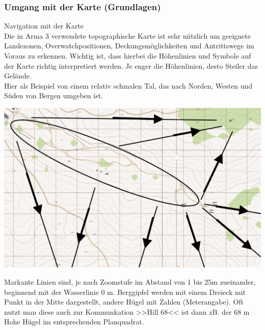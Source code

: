 \newpage

\subsubsection{Umgang mit der Karte (Grundlagen)}

	Navigation mit der Karte \\

	Die in Arma 3 verwendete topographische Karte ist sehr nützlich um geeignete Landezonen, Overwatchpositionen, Deckungsmöglichkeiten und Antrittswege im Voraus zu erkennen. Wichtig ist, dass hierbei die Höhenlinien und Symbole auf der Karte richtig interpretiert werden. Je enger die Höhenlinien, desto Steiler das Gelände. \\

 

	Hier als Beispiel von einem relativ schmalen Tal, das nach Norden, Westen und Süden von Bergen umgeben ist. \\
\begin{minipage}[t]{1\textwidth}
	\includegraphics[width=\textwidth]{./img/fortgeschrittenes/karteUndMarkierungen/Karte1.png}
\end{minipage}

	Markante Linien sind, je nach Zoomstufe im Abstand von 1 bis 25m zueinander, beginnend mit der Wasserlinie 0 m. Berggipfel werden mit einem Dreieck mit Punkt in der Mitte dargestellt, andere Hügel mit Zahlen (Meterangabe). Oft nutzt man diese auch zur Kommunkation >>Hill 68<< ist dann zB. der 68 m Hohe Hügel im entsprechenden Planquadrat. \\

